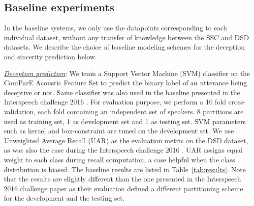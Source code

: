 \documentclass{article}
\begin{document}
\begin{spacing}{0.89}
\subsection{Baseline experiments}
\vspace{-2mm}

In the baseline systems, we only use the datapoints corresponding to each individual dataset, without any transfer of knowledge between the SSC and DSD datasets.
We describe the choice of baseline modeling schemes for the deception and sincerity prediction below.

\underline{\it Deception prediction}: 
We train a Support Vector Machine (SVM) classifier on the ComParE Acoustic Feature Set \cite{weninger2013acoustics} to predict the binary label of an utterance being deceptive or not.
Same classifier was also used in the baseline presented in the Interspeech challenge 2016 \cite{schuller2016interspeech}.
For evaluation purpose, we perform a 10 fold cross-validation, each fold containing an independent set of speakers.  
8 partitions are used as training set, 1 as development set and 1 as testing set.
SVM parameters such as kernel and box-constraint are tuned on the development set.
We use Unweighted Average Recall (UAR) as the evaluation metric on the DSD dataset, as was also the case during the Interspeech challenge 2016 \cite{schuller2016interspeech}.
UAR assigns equal weight to each class during recall computation, a case helpful when the class distribution is biased. 
The baseline results are listed in Table~\ref{tab:results}.
Note that the results are slightly different than the one presented in the Interspeech 2016 challenge paper \cite{schuller2016interspeech} as their evaluation defined a different partitioning scheme for the development and the testing set.


\end{spacing}
\end{document}

